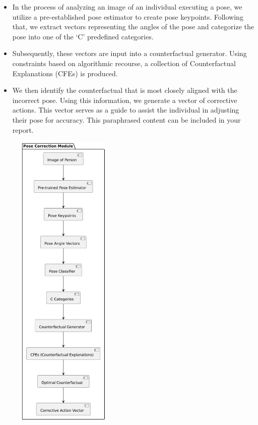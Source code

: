 \begin{multicols}{2}

	\begin{itemize}
    \item In the process of analyzing an image of an individual executing a pose, we utilize a pre-established pose estimator to create pose keypoints. Following that, we extract vectors representing the angles of the pose and categorize the pose into one of the ‘C’ predefined categories.

    \item Subsequently, these vectors are input into a counterfactual generator. Using constraints based on algorithmic recourse, a collection of Counterfactual Explanations (CFEs) is produced.

    \item We then identify the counterfactual that is most closely aligned with the incorrect pose. Using this information, we generate a vector of corrective actions. This vector serves as a guide to assist the individual in adjusting their pose for accuracy. This paraphrased content can be included in your report.
\end{itemize}
	\begin{minipage}{0.4\textwidth}
		\begin{figure}[H]
			\centering
			\includegraphics[width=0.4\textwidth]{Images/image1 (2).png}
			\label{fig: style 2 image c}
		\end{figure}
	\end{minipage}
\newline 	    
\end{multicols}


